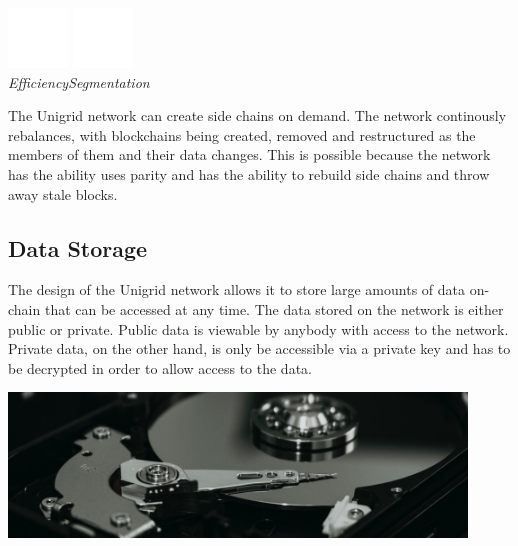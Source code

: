 \documentclass{article}
\begin{document}
\begin{center}
\vspace{0.1cm}
\includegraphics[width=45pt]{efficiency}
\hspace{1.5cm}
\includegraphics[width=45pt]{segmented}
\\
\vspace{0.1cm}
\hspace{10pt}\emph{Efficiency}\hspace{46pt}\emph{Segmentation}
\end{center}

\noindent The Unigrid network can create side chains on demand. The network continously rebalances, with blockchains being created, removed and restructured as the members of them and their data changes. This is possible because the network has the ability uses parity and has the ability to rebuild side chains and throw away stale blocks.

\subsection{Data Storage}
The design of the Unigrid network allows it to store large amounts of data on-chain that can be accessed at any time. The data stored on the network is either public or private. Public data is viewable by anybody with access to the network. Private data, on the other hand, is only be accessible via a private key and has to be decrypted in order to allow access to the data.

\begin{mdframed}[style=textimage]
	\includegraphics[width=345pt]{hard-drive}
\end{mdframed}
\end{document}
